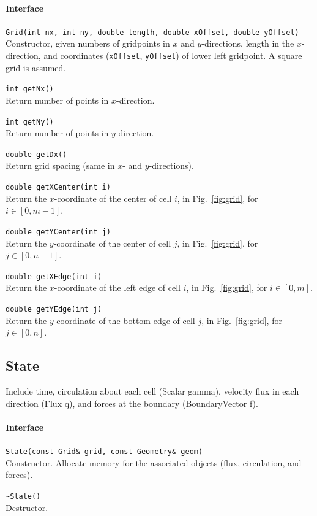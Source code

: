 \documentclass[11pt]{article}
\let\code\lstinline
\begin{document}
\paragraph{Interface}
\begin{description}
	\item \code|Grid(int nx, int ny, double length, double xOffset, double yOffset)|\\
		Constructor, given numbers of gridpoints in $x$ and $y$-directions, length in the $x$-direction, and coordinates (\code|xOffset|, \code|yOffset|) of lower left gridpoint.  A square grid is assumed.
	\item \code|int getNx()|\\
		Return number of points in $x$-direction.
	\item \code|int getNy()|\\
		Return number of points in $y$-direction.
	\item \code|double getDx()|\\
		Return grid spacing (same in $x$- and $y$-directions).
	\item \code|double getXCenter(int i)|\\
		Return the $x$-coordinate of the center of cell $i$, in Fig.~\ref{fig:grid}, for $i\in[0,m-1]$.
	\item \code|double getYCenter(int j)|\\
		Return the $y$-coordinate of the center of cell $j$, in Fig.~\ref{fig:grid}, for $j\in[0,n-1]$.
	\item \code|double getXEdge(int i)|\\
		Return the $x$-coordinate of the left edge of cell $i$, in Fig.~\ref{fig:grid}, for $i\in[0,m]$.
	\item \code|double getYEdge(int j)|\\
		Return the $y$-coordinate of the bottom edge of cell $j$, in Fig.~\ref{fig:grid}, for $j\in[0,n]$.		
\end{description}


\subsection{State}
Include time, circulation about each cell (Scalar gamma), velocity flux in each direction (Flux q), and forces at the boundary (BoundaryVector f).

\paragraph{Interface}
\begin{description}
	\item \code|State(const Grid& grid, const Geometry& geom)|\\
		Constructor.  Allocate memory for the associated objects (flux, circulation, and forces).
	\item \code|~State()|\\
		Destructor.
\end{description}
\end{document}
